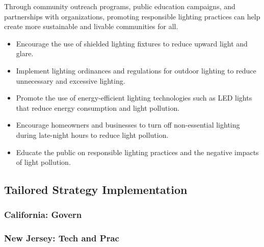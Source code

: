 Through community outreach programs, public education campaigns, and partnerships with organizations, promoting responsible lighting practices can help create more sustainable and livable communities for all.
\begin{itemize}
    \item Encourage the use of shielded lighting fixtures to reduce upward light and glare.
    
    \item Implement lighting ordinances and regulations for outdoor lighting to reduce unnecessary and excessive lighting.
    
    \item Promote the use of energy-efficient lighting technologies such as LED lights that reduce energy consumption and light pollution.
    
    \item Encourage homeowners and businesses to turn off non-essential lighting during late-night hours to reduce light pollution.
    
    \item Educate the public on responsible lighting practices and the negative impacts of light pollution.
\end{itemize}



\subsection{Tailored Strategy Implementation}

\subsubsection{California: Govern}

\subsubsection{New Jersey: Tech and Prac}


